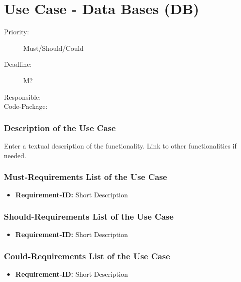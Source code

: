 \section{Use Case - Data Bases (DB)}
\label{UseCase:DB}

\begin{description}
\item[Priority:] Must/Should/Could
\item[Deadline:] M?
\item[Responsible:]
\item[Code-Package:]
\end{description}

\subsubsection*{Description of the Use Case}

Enter a textual description of the functionality. Link to other functionalities if needed. 


\subsubsection*{Must-Requirements List of the Use Case}

\begin{itemize}
\item \textbf{Requirement-ID:} Short Description
\end{itemize}

\subsubsection*{Should-Requirements List of the Use Case}

\begin{itemize}
\item \textbf{Requirement-ID:} Short Description
\end{itemize}

\subsubsection*{Could-Requirements List of the Use Case}

\begin{itemize}
\item \textbf{Requirement-ID:} Short Description
\end{itemize}


